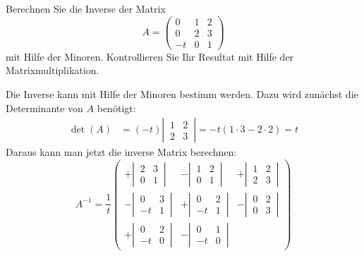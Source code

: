 Berechnen Sie die Inverse der Matrix
\[
A=
\begin{pmatrix}
 0& 1& 2\\
 0& 2& 3\\
-t& 0& 1
\end{pmatrix}
\]
mit Hilfe der Minoren. Kontrollieren Sie Ihr Resultat
mit Hilfe der Matrixmultiplikation.


\begin{loesung}
Die Inverse kann mit Hilfe der Minoren bestimm werden. Dazu wird zunächst die
Determinante von $A$ benötigt:
\begin{align*}
\det(A)&=(-t)\left|\,
\begin{matrix}
1&2\\2&3
\end{matrix}
\,\right|
=
-t(1\cdot 3-2\cdot 2)=t
\end{align*}
Daraus kann man jetzt die inverse Matrix berechnen:
\[
A^{-1}
=
\frac1t
\begin{pmatrix}
 +\left|\,\begin{matrix} 2&3\\0&1\end{matrix}\,\right|
&-\left|\,\begin{matrix} 1&2\\0&1\end{matrix}\,\right|
&+\left|\,\begin{matrix} 1&2\\2&3\end{matrix}\,\right|\\
 -\left|\,\begin{matrix} 0&3\\-t&1\end{matrix}\,\right|
&+\left|\,\begin{matrix} 0&2\\-t&1\end{matrix}\,\right|
&-\left|\,\begin{matrix} 0&2\\0&3\end{matrix}\,\right|\\
 +\left|\,\begin{matrix} 0&2\\-t&0\end{matrix}\,\right|
&-\left|\,\begin{matrix} 0&1\\-t&0\end{matrix}\,\right|

\end{pmatrix}\]
\end{loesung}
